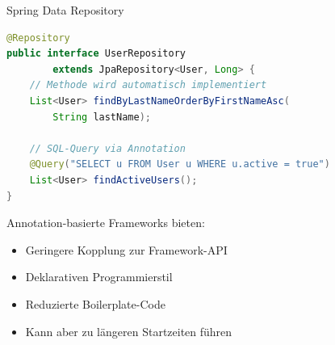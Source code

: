\begin{example}{Spring Data Repository}
\begin{lstlisting}[language=Java, style=base]
@Repository
public interface UserRepository 
        extends JpaRepository<User, Long> {
    // Methode wird automatisch implementiert
    List<User> findByLastNameOrderByFirstNameAsc(
        String lastName);
    
    // SQL-Query via Annotation
    @Query("SELECT u FROM User u WHERE u.active = true")
    List<User> findActiveUsers();
}
\end{lstlisting}
\end{example}

\begin{remark}
Annotation-basierte Frameworks bieten:
\begin{itemize}
    \item Geringere Kopplung zur Framework-API
    \item Deklarativen Programmierstil
    \item Reduzierte Boilerplate-Code
    \item Kann aber zu längeren Startzeiten führen
\end{itemize}
\end{remark}